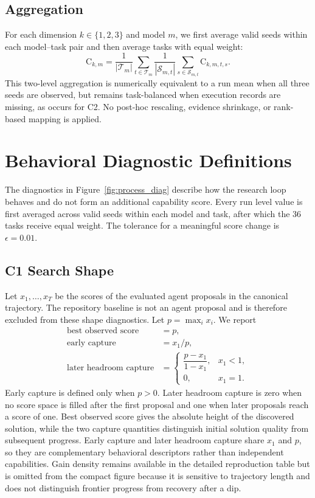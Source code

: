\subsection{Aggregation}

For each dimension $k\in\{1,2,3\}$ and model $m$, we first average valid seeds within each model--task pair and then average tasks with equal weight:
\[
  \mathrm{C}_{k,m}=\frac{1}{|\mathcal T_m|}
  \sum_{t\in\mathcal T_m}
  \frac{1}{|\mathcal S_{m,t}|}
  \sum_{s\in\mathcal S_{m,t}}\mathrm{C}_{k,m,t,s}.
\]
This two-level aggregation is numerically equivalent to a run mean when all three seeds are observed, but remains task-balanced when execution records are missing, as occurs for C2.  No post-hoc rescaling, evidence shrinkage, or rank-based mapping is applied.


\section{Behavioral Diagnostic Definitions}
\label{sec:appendix_diag}

The diagnostics in Figure~\ref{fig:process_diag} describe how the research loop behaves and do not form an additional capability score.  Every run level value is first averaged across valid seeds within each model and task, after which the 36 tasks receive equal weight.  The tolerance for a meaningful score change is \(\epsilon=0.01\).

\subsection{C1 Search Shape}

Let \(x_1,\ldots,x_T\) be the scores of the evaluated agent proposals in the canonical trajectory.  The repository baseline is not an agent proposal and is therefore excluded from these shape diagnostics.  Let \(p=\max_i x_i\).  We report
\[
\begin{aligned}
\text{best observed score} & = p,\\
\text{early capture} & = x_1/p,\\
\text{later headroom capture} & =
\begin{cases}
\dfrac{p-x_1}{1-x_1}, & x_1<1,\\
0, & x_1=1.
\end{cases}
\end{aligned}
\]
Early capture is defined only when \(p>0\).  Later headroom capture is zero when no score space is filled after the first proposal and one when later proposals reach a score of one.  Best observed score gives the absolute height of the discovered solution, while the two capture quantities distinguish initial solution quality from subsequent progress.  Early capture and later headroom capture share \(x_1\) and \(p\), so they are complementary behavioral descriptors rather than independent capabilities.  Gain density remains available in the detailed reproduction table but is omitted from the compact figure because it is sensitive to trajectory length and does not distinguish frontier progress from recovery after a dip.

